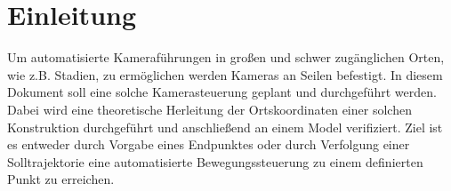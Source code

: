 \section{Einleitung}
		Um automatisierte Kameraführungen in großen und schwer zugänglichen Orten, wie z.B. Stadien, zu ermöglichen werden Kameras an Seilen befestigt.
		In diesem Dokument soll eine solche Kamerasteuerung geplant und durchgeführt werden.
		Dabei wird eine theoretische Herleitung der Ortskoordinaten einer solchen Konstruktion durchgeführt und anschließend an einem Model verifiziert.
		Ziel ist es entweder durch Vorgabe eines Endpunktes oder durch Verfolgung einer Solltrajektorie eine automatisierte Bewegungssteuerung zu einem definierten Punkt zu erreichen.
	\pagebreak